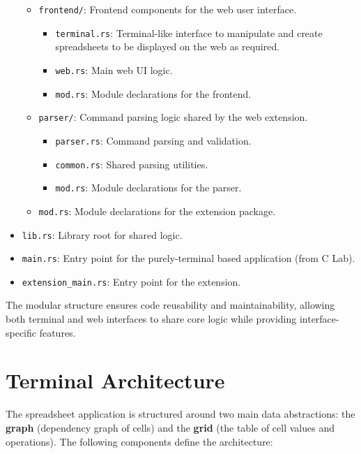 \documentclass{article}
\begin{document}
\begin{itemize}
\begin{itemize}
\begin{itemize}
        \end{itemize}
        \item \texttt{frontend/}: Frontend components for the web user interface.
        \begin{itemize}
            \item \texttt{terminal.rs}: Terminal-like interface to manipulate and create spreadsheets to be displayed on the web as required.
            \item \texttt{web.rs}: Main web UI logic.
            \item \texttt{mod.rs}: Module declarations for the frontend.
        \end{itemize}
        \item \texttt{parser/}: Command parsing logic shared by the web extension.
        \begin{itemize}
            \item \texttt{parser.rs}: Command parsing and validation.
            \item \texttt{common.rs}: Shared parsing utilities.
            \item \texttt{mod.rs}: Module declarations for the parser.
        \end{itemize}
        \item \texttt{mod.rs}: Module declarations for the extension package.
    \end{itemize}
    \item \texttt{lib.rs}: Library root for shared logic.
    \item \texttt{main.rs}: Entry point for the purely-terminal based application (from C Lab).
    \item \texttt{extension\_main.rs}: Entry point for the extension.
\end{itemize}

\noindent
The modular structure ensures code reusability and maintainability, allowing both terminal and web interfaces to share core logic while providing interface-specific features.


\section{Terminal Architecture}
The spreadsheet application is structured around two main data abstractions: the \textbf{graph} (dependency graph of cells) and the \textbf{grid} (the table of cell values and operations). The following components define the architecture:
\end{document}
